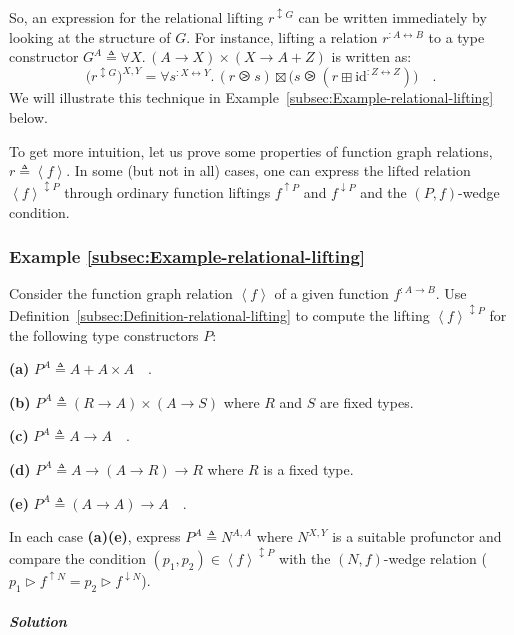 So, an expression for the relational lifting $r^{\updownarrow G}$
can be written immediately by looking at the structure of $G$. For
instance, lifting a relation $r^{:A\leftrightarrow B}$ to a type
constructor $G^{A}\triangleq\forall X.\,\left(A\rightarrow X\right)\times\left(X\rightarrow A+Z\right)$
is written as:
\[
\big(r^{\updownarrow G}\big)^{X,Y}=\forall s^{:X\leftrightarrow Y}.\,(r\ogreaterthan s)\boxtimes\big(s\ogreaterthan(r\boxplus\text{id}^{:Z\leftrightarrow Z})\big)\quad.
\]
 We will illustrate this technique in Example~\ref{subsec:Example-relational-lifting}
below.

To get more intuition, let us prove some properties of function graph
relations, $r\triangleq\left<f\right>$. In some (but not in all)
cases, one can express the lifted relation $\left<f\right>^{\updownarrow P}$
through ordinary function liftings $f^{\uparrow P}$ and $f^{\downarrow P}$
and the $\left(P,f\right)$-wedge condition.

\subsubsection{Example \label{subsec:Example-relational-lifting}\ref{subsec:Example-relational-lifting}}

Consider the function graph relation $\left<f\right>$ of a given
function $f^{:A\rightarrow B}$. Use Definition~\ref{subsec:Definition-relational-lifting}
to compute the lifting $\left<f\right>^{\updownarrow P}$ for the
following type constructors $P$:

\textbf{(a)} $P^{A}\triangleq A+A\times A\quad$.

\textbf{(b)} $P^{A}\triangleq(R\rightarrow A)\times(A\rightarrow S)$
where $R$ and $S$ are fixed types.

\textbf{(c)} $P^{A}\triangleq A\rightarrow A\quad$.

\textbf{(d)} $P^{A}\triangleq A\rightarrow\left(A\rightarrow R\right)\rightarrow R$
where $R$ is a fixed type.

\textbf{(e)} $P^{A}\triangleq\left(A\rightarrow A\right)\rightarrow A\quad$.

In each case \textbf{(a)}\textendash \textbf{(e)}, express $P^{A}\triangleq N^{A,A}$
where $N^{X,Y}$ is a suitable profunctor and compare the condition
$(p_{1},p_{2})\in\left<f\right>^{\updownarrow P}$ with the $\left(N,f\right)$-wedge
relation ($p_{1}\triangleright f^{\uparrow N}=p_{2}\triangleright f^{\downarrow N}$). 

\subparagraph{Solution}

